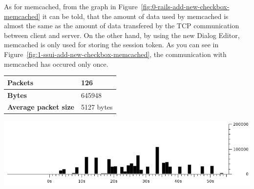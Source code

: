 As for memcached, from the graph in
Figure~\ref{fig:0-rails-add-new-checkbox-memcached} it can be told, that the
amount of data used by memcached is almost the same as the amount of data
transfered by the TCP communication between client and server. On the other
hand, by using the new Dialog Editor, memcached is only used for storing the
session token. As you can see in
Figure~\ref{fig:1-ssui-add-new-checkbox-memcached}, the communication with
memcached has occured only once.

\vspace{\baselineskip}
\noindent\begin{minipage}{\linewidth}
  \centering
  \begin{tabular}{|l|l|}
    \hline
    {\bf Packets}             & 126        \\ \hline
    {\bf Bytes}               & 645948     \\ \hline
    {\bf Average packet size} & 5127 bytes \\ \hline
  \end{tabular}
  \label{tab:0-rails-add-new-checkbox-memcached}
  \includegraphics[width=15cm,keepaspectratio]{fig/0-rails-add-new-checkbox-memcached}
  \label{fig:0-rails-add-new-checkbox-memcached}
\end{minipage}
\vspace{\baselineskip}

